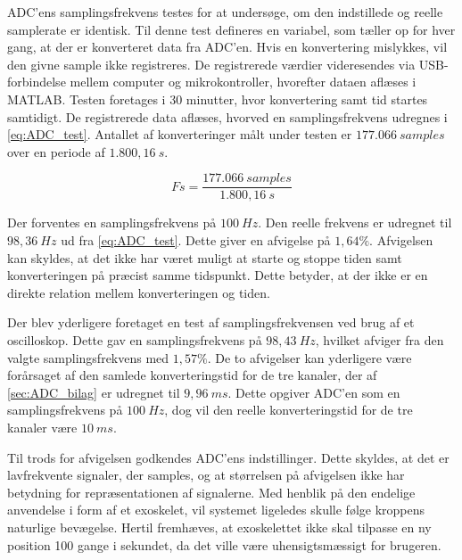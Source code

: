 ADC'ens samplingsfrekvens testes for at undersøge, om den indstillede og reelle samplerate er identisk. 
Til denne test defineres en variabel, som tæller op for hver gang, at der er konverteret data fra ADC'en. 
Hvis en konvertering mislykkes, vil den givne sample ikke registreres. 
De registrerede værdier videresendes via USB-forbindelse mellem computer og mikrokontroller, hvorefter dataen aflæses i MATLAB. 
Testen foretages i 30 minutter, hvor konvertering samt tid startes samtidigt. 
De registrerede data aflæses, hvorved en samplingsfrekvens udregnes i \autoref{eq:ADC_test}. 
Antallet af konverteringer målt under testen er $177.066~samples$ over en periode af $1.800,16~s$.

\begin{equation}\label{eq:ADC_test}
Fs = \frac{177.066~samples}{1.800,16~s}
\end{equation}

\noindent
Der forventes en samplingsfrekvens på $100~Hz$. 
Den reelle frekvens er udregnet til $98,36~Hz$ ud fra \autoref{eq:ADC_test}. 
Dette giver en afvigelse på $1,64\%$. 
Afvigelsen kan skyldes, at det ikke har været muligt at starte og stoppe tiden samt konverteringen på præcist samme tidspunkt. 
Dette betyder, at der ikke er en direkte relation mellem konverteringen og tiden. 

Der blev yderligere foretaget en test af samplingsfrekvensen ved brug af et oscilloskop. 
Dette gav en samplingsfrekvens på $98,43~Hz$, hvilket afviger fra den valgte samplingsfrekvens med $1,57\%$. De to afvigelser kan yderligere være forårsaget  af den samlede konverteringstid for de tre kanaler, der af \autoref{sec:ADC_bilag} er udregnet til $9,96~ms$. 
Dette opgiver ADC'en som en samplingsfrekvens på $100~Hz$, dog vil den reelle konverteringstid for de tre kanaler være $10~ms$.  


Til trods for afvigelsen godkendes ADC'ens indstillinger. 
Dette skyldes, at det er lavfrekvente signaler, der samples, og at størrelsen på afvigelsen ikke har betydning for repræsentationen af signalerne. 
Med henblik på den endelige anvendelse i form af et exoskelet, vil systemet ligeledes skulle følge kroppens naturlige bevægelse. 
Hertil fremhæves, at exoskelettet ikke skal tilpasse en ny position 100 gange i sekundet, da det ville være uhensigtsmæssigt for brugeren.


